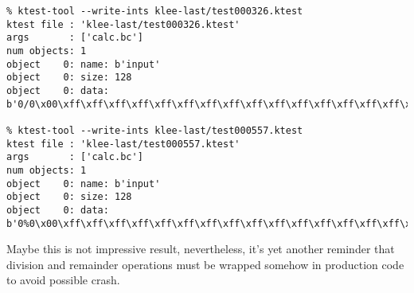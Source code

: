 \begin{lstlisting}
% ktest-tool --write-ints klee-last/test000326.ktest
ktest file : 'klee-last/test000326.ktest'
args       : ['calc.bc']
num objects: 1
object    0: name: b'input'
object    0: size: 128
object    0: data: b'0/0\x00\xff\xff\xff\xff\xff\xff\xff\xff\xff\xff\xff\xff\xff\xff\xff\xff\xff\xff\xff\xff\xff\xff\xff\xff\xff\xff\xff\xff\xff\xff\xff\xff\xff\xff\xff\xff\xff\xff\xff\xff\xff\xff\xff\xff\xff\xff\xff\xff\xff\xff\xff\xff\xff\xff\xff\xff\xff\xff\xff\xff\xff\xff\xff\xff\xff\xff\xff\xff\xff\xff\xff\xff\xff\xff\xff\xff\xff\xff\xff\xff\xff\xff\xff\xff\xff\xff\xff\xff\xff\xff\xff\xff\xff\xff\xff\xff\xff\xff\xff\xff\xff\xff\xff\xff\xff\xff\xff\xff\xff\xff\xff\xff\xff\xff\xff\xff\xff\xff\xff\xff\xff\xff\xff\xff'

% ktest-tool --write-ints klee-last/test000557.ktest
ktest file : 'klee-last/test000557.ktest'
args       : ['calc.bc']
num objects: 1
object    0: name: b'input'
object    0: size: 128
object    0: data: b'0%0\x00\xff\xff\xff\xff\xff\xff\xff\xff\xff\xff\xff\xff\xff\xff\xff\xff\xff\xff\xff\xff\xff\xff\xff\xff\xff\xff\xff\xff\xff\xff\xff\xff\xff\xff\xff\xff\xff\xff\xff\xff\xff\xff\xff\xff\xff\xff\xff\xff\xff\xff\xff\xff\xff\xff\xff\xff\xff\xff\xff\xff\xff\xff\xff\xff\xff\xff\xff\xff\xff\xff\xff\xff\xff\xff\xff\xff\xff\xff\xff\xff\xff\xff\xff\xff\xff\xff\xff\xff\xff\xff\xff\xff\xff\xff\xff\xff\xff\xff\xff\xff\xff\xff\xff\xff\xff\xff\xff\xff\xff\xff\xff\xff\xff\xff\xff\xff\xff\xff\xff\xff\xff\xff\xff\xff'
\end{lstlisting}

Maybe this is not impressive result, nevertheless,
it's yet another reminder that division and remainder operations must be wrapped somehow in production code to avoid possible crash.

